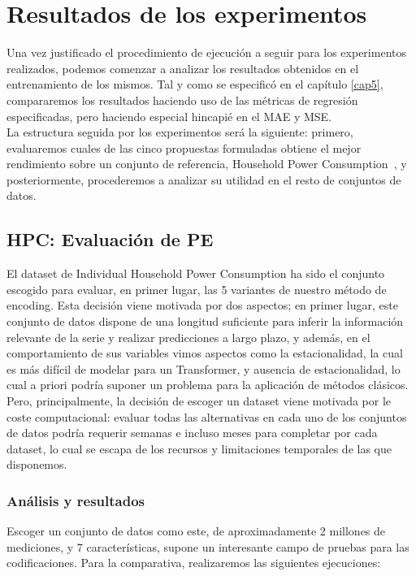 \section{Resultados de los experimentos}

Una vez justificado el procedimiento de ejecución a seguir para los experimentos realizados, podemos comenzar a analizar los resultados obtenidos en el entrenamiento de los mismos. Tal y como se especificó en el capítulo \ref{cap5}, compararemos los resultados haciendo uso de las métricas de regresión especificadas, pero haciendo especial hincapié en el MAE y MSE.\\

La estructura seguida por los experimentos será la siguiente: primero, evaluaremos cuales de las cinco propuestas formuladas obtiene el mejor rendimiento sobre un conjunto de referencia, Household Power Consumption~\cite{hebrail2006individual}, y posteriormente, procederemos a analizar su utilidad en el resto de conjuntos de datos.

\subsection{HPC: Evaluación de PE}

El dataset de Individual Household Power Consumption ha sido el conjunto escogido para evaluar, en primer lugar, las 5 variantes de nuestro método de encoding. Esta decisión viene motivada por dos aspectos; en primer lugar, este conjunto de datos dispone de una longitud suficiente para inferir la información relevante de la serie y realizar predicciones a largo plazo, y además, en el comportamiento de sus variables vimos aspectos como la estacionalidad, la cual es más difícil de modelar para un Transformer, y ausencia de estacionalidad, lo cual a priori podría suponer un problema para la aplicación de métodos clásicos. Pero, principalmente, la decisión de escoger un dataset viene motivada por le coste computacional: evaluar todas las alternativas en cada uno de los conjuntos de datos podría requerir semanas e incluso meses para completar por cada dataset, lo cual se escapa de los recursos y limitaciones temporales de las que disponemos.

\subsubsection{Análisis y resultados}

Escoger un conjunto de datos como este, de aproximadamente 2 millones de mediciones, y 7 características, supone un interesante campo de pruebas para las codificaciones. Para la comparativa, realizaremos las siguientes ejecuciones:

